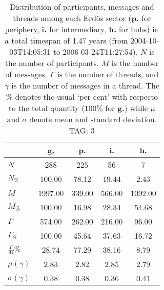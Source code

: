 \begin{table}[h!]
\begin{center}
\begin{tabular}{| l || c | c | c | c |}\hline
 & {\bf g.} & {\bf p.} & {\bf i.} & {\bf h.} \\\hline\hline
$N$ & 288  & 225  & 56  & 7 \\
$N_{\%}$ & 100.00  & 78.12  & 19.44  & 2.43 \\\hline
$M$ & 1997.00  & 339.00  & 566.00  & 1092.00 \\
$M_{\%}$ & 100.00  & 16.98  & 28.34  & 54.68 \\\hline
$\Gamma$ & 574.00  & 262.00  & 216.00  & 96.00 \\
$\Gamma_{\%}$ & 100.00  & 45.64  & 37.63  & 16.72 \\\hline
$\frac{\Gamma}{M}\%$ & 28.74  & 77.29  & 38.16  & 8.79 \\
$\mu(\gamma)$ & 2.83  & 2.82  & 2.85  & 2.79 \\
$\sigma(\gamma)$ & 0.38  & 0.38  & 0.36  & 0.41 \\\hline
\end{tabular}
\caption{Distribution of participants, messages and threads among each Erd\"os sector ({\bf p.} for periphery, {\bf i.} for intermediary, 
    {\bf h.} for hubs) in a total timespan of 1.47 years (from 2004-10-03T14:05:31 to 2006-03-24T11:27:54). $N$ is the number of participants, $M$ is the number of messages, $\Gamma$ is the number of threads, and $\gamma$ is the number of messages in a thread.
    The \% denotes the usual `per cent' with respecto to the total quantity ($100\%$ for {\bf g.})
    while $\mu$ and $\sigma$ denote mean and standard deviation. TAG: 3}
\end{center}
\end{table}